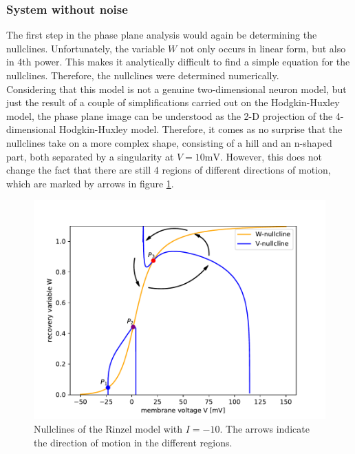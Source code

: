 \documentclass[12pt,a4paper]{article}
\begin{document}
\subsubsection{System without noise}
The first step in the phase plane analysis would again be determining the nullclines. Unfortunately, the variable $W$ not only occurs in linear form, but also in 4th power. This makes it analytically difficult to find a simple equation for the nullclines. Therefore, the nullclines were determined numerically.\\
Considering that this model is not a genuine two-dimensional neuron model, but just the result of a couple of simplifications carried out on the Hodgkin-Huxley model, the phase plane image can be understood as the 2-D projection of the 4-dimensional Hodgkin-Huxley model. Therefore, it comes as no surprise that the nullclines take on a more complex shape, consisting of a hill and an n-shaped part, both separated by a singularity at $V=10\text{mV}$. However, this does not change the fact that there are still 4 regions of different directions of motion, which are marked by arrows in figure \ref{rinzelnc}. 
\begin{figure}[H]
	\centering
	\includegraphics[scale=0.95]{rinzelclinesarrowwp.pdf}\caption{Nullclines of the Rinzel model with $I=-10$. The arrows indicate the direction of motion in the different regions.}
	\label{rinzelnc}
\end{figure}
\end{document}
